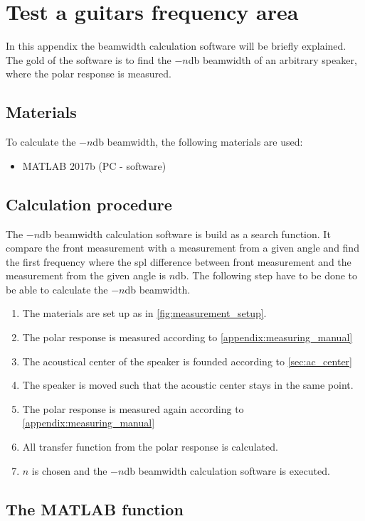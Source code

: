 \chapter*{Test a guitars frequency area}\label{appendix:beamwidth}
In this appendix the beamwidth calculation software will be briefly explained. The gold of the software is to find the $-n$\si{\decibel} beamwidth of an arbitrary speaker, where the polar response is measured. 

\section*{Materials}
To calculate the $-n$\si{\decibel} beamwidth, the following materials are used:
\begin{itemize}
\item MATLAB 2017b (PC - software)
\end{itemize}


\section*{Calculation procedure}
The $-n$\si{\decibel} beamwidth calculation software is build as a search function. It compare the front measurement with a measurement from a given angle and find the first frequency where the \gls{spl} difference between front measurement and the measurement from the given angle is $n$\si{\decibel}. The following step have to be done to be able to calculate the $-n$\si{\decibel} beamwidth.

\begin{enumerate}
\item The materials are set up as in \autoref{fig:measurement_setup}.
\item The polar response is measured according to \autoref{appendix:measuring_manual}
\item The acoustical center of the speaker is founded according to \autoref{sec:ac_center}
\item  The speaker is moved such that the acoustic center stays in the same point. 
\item The polar response is measured again according to \autoref{appendix:measuring_manual}
\item All transfer function from the polar response is calculated.
\item $n$ is chosen and the  $-n$\si{\decibel} beamwidth calculation software is executed.
\end{enumerate}


\section*{The MATLAB function}
